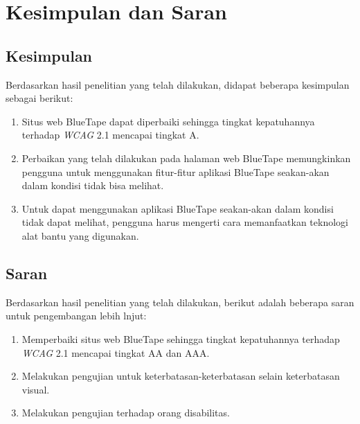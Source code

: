 \chapter{Kesimpulan dan Saran}
\label{chap:kesimpulan_dan_saran}

\section{Kesimpulan}
\label{sec:kesimpulan}
Berdasarkan hasil penelitian yang telah dilakukan, didapat beberapa kesimpulan sebagai berikut:

\begin{enumerate}
    \item Situs web BlueTape dapat diperbaiki sehingga tingkat kepatuhannya terhadap \textit{WCAG} 2.1 mencapai tingkat A.
    \item Perbaikan yang telah dilakukan pada halaman web BlueTape memungkinkan pengguna untuk menggunakan fitur-fitur aplikasi BlueTape seakan-akan dalam kondisi tidak bisa melihat.
    \item Untuk dapat menggunakan aplikasi BlueTape seakan-akan dalam kondisi tidak dapat melihat, pengguna harus mengerti cara memanfaatkan teknologi alat bantu yang digunakan.
\end{enumerate}

\section{Saran}
\label{sec:saran}
Berdasarkan hasil penelitian yang telah dilakukan, berikut adalah beberapa saran untuk pengembangan lebih lnjut:
\begin{enumerate}
    \item Memperbaiki situs web BlueTape sehingga tingkat kepatuhannya terhadap \textit{WCAG} 2.1 mencapai tingkat AA dan AAA.
    \item Melakukan pengujian untuk keterbatasan-keterbatasan selain keterbatasan visual.
    \item Melakukan pengujian terhadap orang disabilitas.
\end{enumerate}
